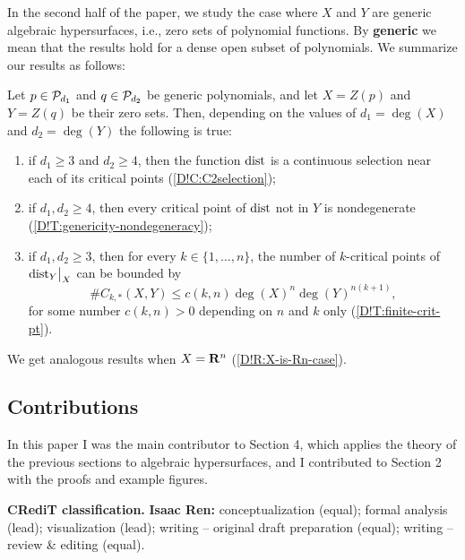 In the second half of the paper, we study the case where $X$ and $Y$ are generic algebraic hypersurfaces, i.e., zero sets of polynomial functions. By \textbf{generic} we mean that the results hold for a dense open subset of polynomials. We summarize our results as follows:

\begin{theorem}
  Let $p \in \mathcal{P}_{d_1}$ and $q \in \mathcal{P}_{d_2}$ be generic polynomials, and let $X = Z(p)$ and $Y = Z(q)$ be their zero sets. Then, depending on the values of $d_1 = \deg(X)$ and $d_2 = \deg(Y)$ the following is true:
  \begin{enumerate}
    \item if $d_1 \geq 3$ and $d_2 \geq 4$, then the function $\operatorname{dist}$ is a continuous selection near each of its critical points (\cref{D!C:C2selection});
    \item if $d_1, d_2 \geq 4$, then every critical point of $\operatorname{dist}$ not in $Y$ is nondegenerate (\cref{D!T:genericity-nondegeneracy});
    \item if $d_1, d_2 \geq 3$, then for every $k \in \{1, \ldots, n\}$, the number of $k$-critical points of $\mathord{\operatorname{dist}}_Y\big|_X$ can be bounded by
    \[
      \#C_{k, *}(X, Y) \leq c(k, n) \deg(X)^n \deg(Y)^{n (k + 1)},
    \]
    for some number $c(k, n) > 0$ depending on $n$ and $k$ only (\cref{D!T:finite-crit-pt}).
  \end{enumerate}
\end{theorem}

We get analogous results when $X = \mathbf{R}^n$ (\cref{D!R:X-is-Rn-case}).

\subsection*{Contributions}

In this paper I was the main contributor to Section 4, which applies the theory of the previous sections to algebraic hypersurfaces, and I contributed to Section 2 with the proofs and example figures.

\textbf{\sffamily CRediT classification.} \textbf{Isaac Ren:} conceptualization (equal); formal analysis (lead); visualization (lead); writing -- original draft preparation (equal); writing -- review \& editing (equal).

\section[Nondegeneracy of distance functions between C.I.s]{}


